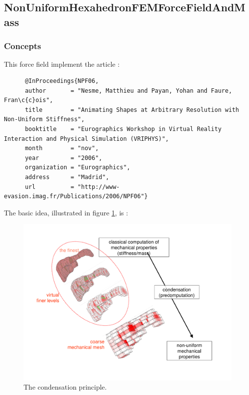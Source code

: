 \subsection{NonUniformHexahedronFEMForceFieldAndMass}
\graphicspath{{../modules/}}  %


\subsubsection{Concepts}

This force field implement the article :

\begin{verbatim}
      @InProceedings{NPF06,
      author       = "Nesme, Matthieu and Payan, Yohan and Faure, Fran\c{c}ois",
      title        = "Animating Shapes at Arbitrary Resolution with Non-Uniform Stiffness",
      booktitle    = "Eurographics Workshop in Virtual Reality Interaction and Physical Simulation (VRIPHYS)",
      month        = "nov",
      year         = "2006",
      organization = "Eurographics",
      address      = "Madrid",
      url          = "http://www-evasion.imag.fr/Publications/2006/NPF06"}
 \end{verbatim}
 
 
 
The basic idea, illustrated in figure \ref{fig:condensation}, is :


\begin{figure}
\begin{center}
	\includegraphics[width=\linewidth]{forcefield/nonUniformHexahedron/condensation.pdf}
\end{center}
	\caption{The condensation principle.}
	\label{fig:condensation}
\end{figure}



